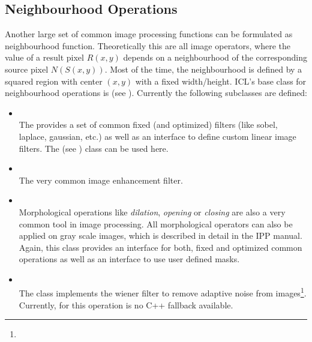 \subsection{Neighbourhood Operations\label{subsec:nbh-ops}}
Another large set of common image processing functions can be formulated as neighbourhood function. Theoretically this are all image operators, where the value of a result pixel $R(x,y)$ depends on a neighbourhood of the corresponding source pixel $N(S(x,y))$. Most of the time, the neighbourhood is defined by a squared region with center $(x,y)$ with a fixed width/height. ICL's base class for neighbourhood operations is  (see ). Currently the following subclasses are defined:

\begin{itemize}
\item \textbf{}\\
The  provides a set of common fixed (and optimized) filters (like sobel, laplace, gaussian, etc.) as well as an interface to define custom linear image filters. The  (see ) class can be used here.
\item \textbf{}\\
The very common image enhancement filter. 
\item \textbf{}\\
Morphological operations like \emph{dilation}, \emph{opening} or \emph{closing} are also a very common tool in image processing. All morphological operators can also be applied on gray scale images, which is described in detail in the IPP manual. Again, this class provides an interface for both, fixed and optimized common operations as well as an interface to use user defined masks.
\item \textbf{}\\
The  class implements the wiener filter to remove adaptive noise from images\footnote{}. Currently, for this operation is no C++ fallback available.
\end{itemize}

